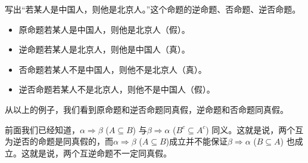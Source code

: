 \begin{example}
	写出“若某人是中国人，则他是北京人。”这个命题的逆命题、否命题、逆否命题。
	
	\begin{itemize}
		\item 原命题\quad 若某人是中国人，则他是北京人（假）。
		\item 逆命题\quad 若某人是北京人，则他是中国人（真）。
		\item 否命题\quad 若某人不是中国人，则他不是北京人（真）。
		\item 逆否命题\quad 若某人不是北京人，则他不是中国人（假）。
	\end{itemize}
\end{example}

从以上的例子，我们看到原命题和逆否命题同真假，逆命题和否命题同真假。

前面我们已经知道，$\alpha\Rightarrow \beta$ ($A\subseteq B$) 与$\beta\Rightarrow\alpha$ ($B^c\subseteq A^c$)
同义。这就是说，两个互为逆否的命题是同真假的，而$\alpha\Rightarrow\beta$ ($A\subseteq B$)成立并不能保证$\beta\Rightarrow \alpha$ ($B\subseteq A$)
也成立。这就是说，两个互逆命题不一定同真假。

